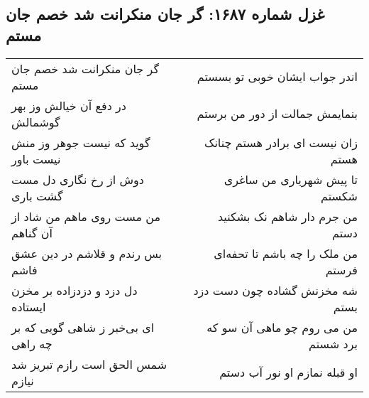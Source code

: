 \begin{center}
\section*{غزل شماره ۱۶۸۷: گر جان منکرانت شد خصم جان مستم}
\label{sec:1687}
\begin{longtable}{l p{0.5cm} r}
گر جان منکرانت شد خصم جان مستم
&&
اندر جواب ایشان خوبی تو بسستم
\\
در دفع آن خیالش وز بهر گوشمالش
&&
بنمایمش جمالت از دور من برستم
\\
گوید که نیست جوهر وز منش نیست باور
&&
زان نیست ای برادر هستم چنانک هستم
\\
دوش از رخ نگاری دل مست گشت باری
&&
تا پیش شهریاری من ساغری شکستم
\\
من مست روی ماهم من شاد از آن گناهم
&&
من جرم دار شاهم نک بشکنید دستم
\\
بس رندم و قلاشم در دین عشق فاشم
&&
من ملک را چه باشم تا تحفه‌ای فرستم
\\
دل دزد و دزدزاده بر مخزن ایستاده
&&
شه مخزنش گشاده چون دست دزد بستم
\\
ای بی‌خبر ز شاهی گویی که بر چه راهی
&&
من می روم چو ماهی آن سو که برد شستم
\\
شمس الحق است رازم تبریز شد نیازم
&&
او قبله نمازم او نور آب دستم
\\
\end{longtable}
\end{center}
